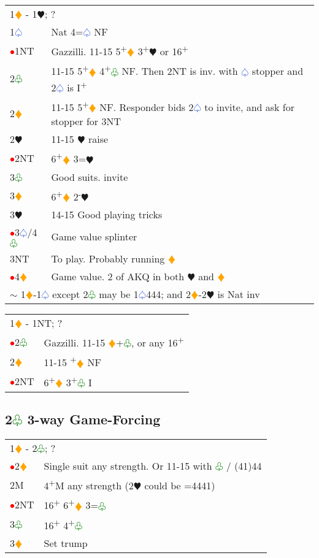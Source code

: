\documentclass{article}
\renewcommand{\sp}{\textcolor{RoyalBlue}{$\varspade$}}
\newcommand{\he}{\textcolor{RubineRed}{$\varheart$}}
\newcommand{\di}{\textcolor{Orange}{$\vardiamond$}}
\newcommand{\cl}{\textcolor{Green}{$\varclub$}}
\newcommand{\nt}{\relsize{-1}NT\relsize{1}}
\newcommand{\up}{\textsuperscript{+}}
\newcommand{\down}{\textsuperscript{-}}
\newcommand{\al}{\textcolor{red}{$\bullet$}}
\begin{document}
\begin{tabular}{|l|p{6.5cm}}
	\multicolumn{2}{l}{1\di{} - 1\he{}; ?}\\
	1\sp{} & Nat 4=\sp{} NF \\
	\al{}1\nt & Gazzilli. 11-15 5\up{}\di{} 3\up{}\he{} or 16\up{}\\
	2\cl{} & 11-15 5\up\di{} 4\up\cl{} NF. Then 2\nt{} is inv. with \sp{} stopper and 2\sp{} is I\up{} \\
	2\di{} & 11-15 5\up\di{} NF. Responder bids 2\sp{} to invite, and ask for stopper for 3\nt \\
	2\he{}& 11-15 \he{} raise \\
	\al{}2\nt &  6\up{}\di{} 3={}\he{} \\
	3\cl{} & Good suits. invite \\
	3\di{} & 6\up{}\di{} 2\down{}\he{} \\
	3\he{} & 14-15 Good playing tricks \\
	\al{}3\sp{}/4\cl{} & Game value splinter \\
	3\nt{} & To play. Probably running \di{} \\
	\al{}4\di{} & Game value. 2 of AKQ in both \he{} and \di{} \\
	\multicolumn{2}{l}{$\sim$ 1\di{}-1\sp{} except 2\cl{} may be 1\sp{}444; and 2\di{}-2\he{} is Nat inv}
\end{tabular}

\medskip

\begin{tabular}{|l|p{6.5cm}}
	\multicolumn{2}{l}{1\di{} - 1\nt{}; ?}\\
	\al{}2\cl{} & Gazzilli. 11-15 \di{}+\cl{}, or any 16\up \\
    2\di{} & 11-15 \up\di{} NF \\
    \al{}2\nt{} & 6\up{}\di{} 3\up{}\cl{} I \\
\end{tabular}


\subsection{2\cl{} 3-way Game-Forcing}

\begin{tabular}{|l|p{6.5cm}}
	\multicolumn{2}{l}{1\di{} - 2\cl{}; ?} \\
	\al{}2\di{} & Single suit any strength. Or 11-15 with \cl{} / (41)44 \\
	2M & 4\up{}M any strength (2\he{} could be =4441) \\
	\al{}2\nt{} & 16\up{} 6\up\di{} 3=\cl{} \\
	3\cl{} & 16\up{} 4\up{}\cl{} \\
	3\di{} & Set trump \\
\end{tabular}
\end{document}
